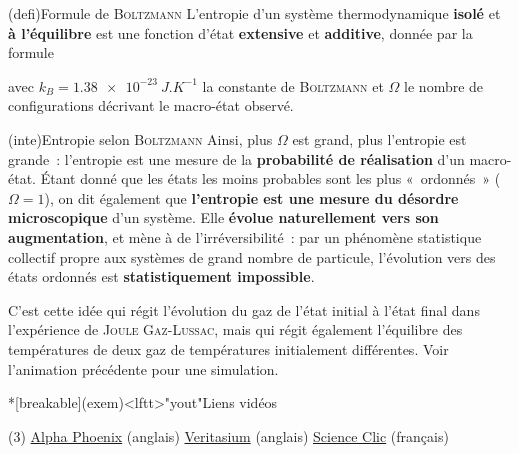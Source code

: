 \documentclass[../../main/main.tex]{subfiles}
\begin{document}
\begin{tcb*}(defi){Formule de \textsc{Boltzmann}}
	L'entropie d'un système thermodynamique \textbf{isolé} et \textbf{à
		l'équilibre} est une fonction d'état \textbf{extensive} et \textbf{additive},
	donnée par la formule
	\smallbreak
	\begin{isd}
		\vspace{-15pt}
		\psw{%
			\[
				\boxed{S = k_B \ln \Omega}
			\]
		}%
		\vspace{-25pt}
		\tcblower
		\vspace{-15pt}
		\psw{%
			\[
				\si{J.K^{-1}}
			\]
		}%
		\vspace{-25pt}
	\end{isd}
	avec $k_B = \SI{1.38e-23}{J.K^{-1}}$ la constante de \textsc{Boltzmann} et
	$\Omega$ le nombre de configurations décrivant le macro-état observé.
\end{tcb*}
\begin{tcb*}(inte){Entropie selon \textsc{Boltzmann}}
	Ainsi, plus $\Omega$ est grand, plus l'entropie est grande~: l'entropie est
	une mesure de la \textbf{probabilité de réalisation} d'un macro-état. Étant
	donné que les états les moins probables sont les plus «~ordonnés~» ($\Omega =
		1$), on dit également que \textbf{l'entropie est une mesure du désordre
		microscopique} d'un système.
	\bigbreak
	Elle \textbf{évolue naturellement vers son augmentation}, et mène à de
	l'irréversibilité~: par un phénomène statistique collectif propre aux systèmes
	de grand nombre de particule, l'évolution vers des états ordonnés est
	\textbf{statistiquement impossible}.
\end{tcb*}

C'est cette idée qui régit l'évolution du gaz de l'état initial à l'état final
dans l'expérience de \textsc{Joule Gaz-Lussac}, mais qui régit également
l'équilibre des températures de deux gaz de températures initialement
différentes. Voir l'animation précédente pour une simulation.

\begin{tcn}*[breakable](exem)<lftt>"yout"{Liens vidéos}
	\begin{tasks}[label=\bdmd](3)
		\task \href{https://www.youtube.com/watch?v=VCXqELB3UPg}{Alpha Phoenix}
		(anglais)
		\task \href{https://www.youtube.com/watch?v=DxL2HoqLbyA}{Veritasium}
		(anglais)
		\task \href{https://www.youtube.com/watch?v=flz_aSIJS0A}{Science Clic}
		(français)
	\end{tasks}
\end{tcn}
\end{document}
